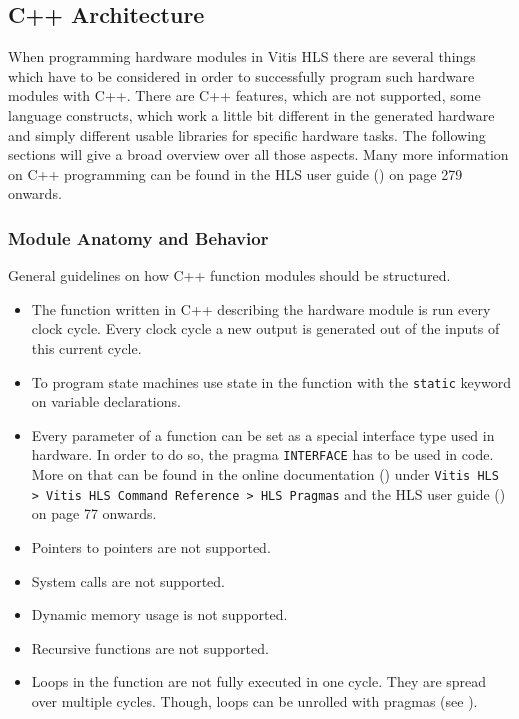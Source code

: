 \subsection{C++ Architecture}\label{section:cpp_coding}
When programming hardware modules in Vitis HLS there are several things which have to be considered in order to successfully program such hardware modules with C++. There are C++ features, which are not supported, some language constructs, which work a little bit different in the generated hardware and simply different usable libraries for specific hardware tasks. The following sections will give a broad overview over all those aspects. Many more information on C++ programming can be found in the HLS user guide (\cite{xilinx:hls_bible}) on page 279 onwards.

\subsubsection{Module Anatomy and Behavior}
General guidelines on how C++ function modules should be structured.
\begin{itemize}
  \item The function written in C++ describing the hardware module is run every clock cycle. Every clock cycle a new output is generated out of the inputs of this current cycle.
  \item To program state machines use state in the function with the \texttt{static} keyword on variable declarations.
  \item Every parameter of a function can be set as a special interface type used in hardware. In order to do so, the pragma \texttt{INTERFACE} has to be used in code. More on that can be found in the online documentation (\cite{xilinx:online_docs}) under \texttt{Vitis HLS > Vitis HLS Command Reference > HLS Pragmas} and the HLS user guide (\cite{xilinx:hls_bible}) on page 77 onwards.
  \item Pointers to pointers are not supported.
  \item System calls are not supported.
  \item Dynamic memory usage is not supported.
  \item Recursive functions are not supported.
  \item Loops in the function are not fully executed in one cycle. They are spread over multiple cycles. Though, loops can be unrolled with pragmas (see \cite{xilinx:online_docs}).
\end{itemize}

